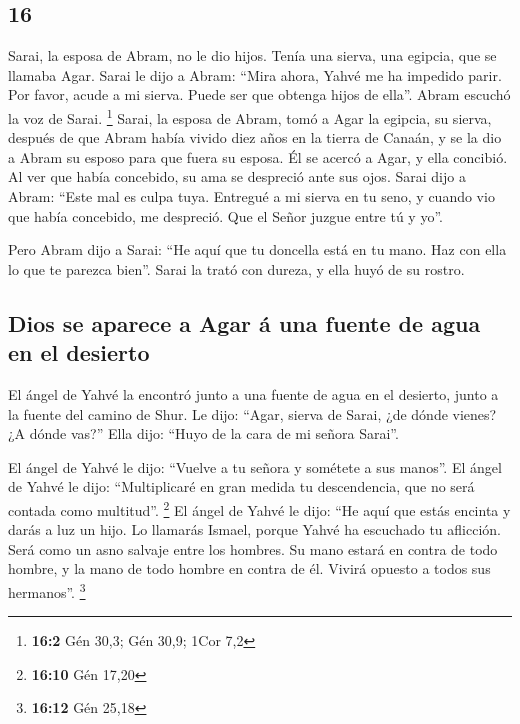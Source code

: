 \begin{paracol}{2}
\hypertarget{section-30}{%
\section{16}\label{section-30}}

 Sarai, la esposa de Abram, no le dio hijos. Tenía una
sierva, una egipcia, que se llamaba Agar.  Sarai le dijo a
Abram: ``Mira ahora, Yahvé me ha impedido parir. Por favor, acude a mi
sierva. Puede ser que obtenga hijos de ella''. Abram escuchó la voz de
Sarai. \footnote{\textbf{16:2} Gén 30,3; Gén 30,9; 1Cor 7,2}
 Sarai, la esposa de Abram, tomó a Agar la egipcia, su
sierva, después de que Abram había vivido diez años en la tierra de
Canaán, y se la dio a Abram su esposo para que fuera su esposa.
 Él se acercó a Agar, y ella concibió. Al ver que había
concebido, su ama se despreció ante sus ojos.  Sarai dijo
a Abram: ``Este mal es culpa tuya. Entregué a mi sierva en tu seno, y
cuando vio que había concebido, me despreció. Que el Señor juzgue entre
tú y yo''.

 Pero Abram dijo a Sarai: ``He aquí que tu doncella está
en tu mano. Haz con ella lo que te parezca bien''. Sarai la trató con
dureza, y ella huyó de su rostro.

\hypertarget{dios-se-aparece-a-agar-uxe1-una-fuente-de-agua-en-el-desierto}{%
\subsection{Dios se aparece a Agar á una fuente de agua en el
desierto}\label{dios-se-aparece-a-agar-uxe1-una-fuente-de-agua-en-el-desierto}}

 El ángel de Yahvé la encontró junto a una fuente de agua
en el desierto, junto a la fuente del camino de Shur.  Le
dijo: ``Agar, sierva de Sarai, ¿de dónde vienes? ¿A dónde vas?'' Ella
dijo: ``Huyo de la cara de mi señora Sarai''.

 El ángel de Yahvé le dijo: ``Vuelve a tu señora y
sométete a sus manos''.  El ángel de Yahvé le dijo:
``Multiplicaré en gran medida tu descendencia, que no será contada como
multitud''. \footnote{\textbf{16:10} Gén 17,20}  El ángel
de Yahvé le dijo: ``He aquí que estás encinta y darás a luz un hijo. Lo
llamarás Ismael, porque Yahvé ha escuchado tu aflicción. 
Será como un asno salvaje entre los hombres. Su mano estará en contra de
todo hombre, y la mano de todo hombre en contra de él. Vivirá opuesto a
todos sus hermanos''. \footnote{\textbf{16:12} Gén 25,18}


\end{paracol}
